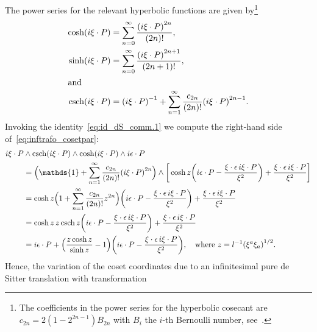 \documentclass[
final,
11pt,
a4paper,
DIV=11,
headinclude=true,
footinclude=false,
bibliography=totoc,
twoside=true,  %
BCOR=5mm
]{scrbook}
\begin{document}
The power series for the relevant hyperbolic functions are given 
by\footnote{The coefficients in the power series for the 
  hyperbolic cosecant are $c_{2n} = 2(1-2^{2n-1}) B_{2n}$ with 
  $B_i$ the $i$-th Bernoulli number, 
  see~\cite{Abramowitz:1968mf}.}~\cite{Abramowitz:1968mf}
\begin{subequations}
\begin{align}
  \cosh(i\xi\cdot P) &= \sum_{n=0}^\infty \frac{{(i\xi\cdot 
      P)}^{2n}}{(2n)!},
  \\
  \sinh(i\xi\cdot P) &= \sum_{n=0}^\infty \frac{{(i\xi\cdot 
      P)}^{2n+1}}{(2n+1)!},
  \\
  \intertext{and}
  \mathrm{csch}(i\xi\cdot P) &= {(i\xi\cdot P)}^{-1} 
  + \sum_{n=1}^\infty \frac{c_{2n}}{(2n)!} {(i\xi\cdot 
    P)}^{2n-1}.
\end{align}
\end{subequations}
Invoking the identity~\eqref{eq:id_dS_comm.1} we compute the 
right-hand side of~\eqref{eq:inftrafo_cosetpar}:
\begin{align*}
  i\xi\cdot P &\wedge \mrm{csch}(i\xi\cdot P) \wedge 
  \cosh(i\xi\cdot P) \wedge i\epsilon\cdot P \\
  &= \Big( \mathds{1} + \sum_{n=1}^\infty \frac{c_{2n}}{(2n)!} 
  {(i\xi\cdot P)}^{2n} \Big)\wedge \bigg[\cosh z
  \bigg(i\epsilon\cdot P - \frac{\xi\cdot\epsilon \, i\xi\cdot 
    P}{\xi^2}\bigg) + \frac{\xi\cdot\epsilon \, i\xi\cdot 
    P}{\xi^2} \bigg] \\
  &= \cosh z \Big(1 + \sum_{n=1}^\infty \frac{c_{2n}}{(2n)!} 
  z^{2n} \Big) \bigg(i\epsilon\cdot P - \frac{\xi\cdot\epsilon \, 
    i\xi\cdot P}{\xi^2}\bigg) + \frac{\xi\cdot\epsilon \, 
    i\xi\cdot P}{\xi^2} \\
  &= \cosh z \, z\csch z \bigg(i\epsilon\cdot 
  P - \frac{\xi\cdot\epsilon \, i\xi\cdot P}{\xi^2}\bigg) 
  + \frac{\xi\cdot\epsilon \, i\xi\cdot P}{\xi^2} \\
  &= i\epsilon\cdot P + \Big( \frac{z \cosh z}{\sinh z} - 1 \Big) 
  \bigg(i\epsilon\cdot P - \frac{\xi\cdot\epsilon \, i\xi\cdot 
    P}{\xi^2}\bigg),
  \quad\text{where~}
  z = l^{-1}{(\xi^a\xi_a)}^{1/2}.
\end{align*}
Hence, the variation of the coset coordinates due to an 
infinitesimal pure de Sitter translation with transformation 
\end{document}
